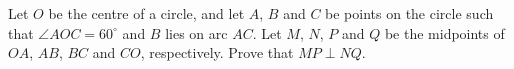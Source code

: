 Let $O$ be the centre of a circle, and let $A$, $B$ and $C$ be points on the circle such that $\angle AOC=60^\circ$ and $B$ lies on arc $AC$. Let $M$, $N$, $P$ and $Q$ be the midpoints of $OA$, $AB$, $BC$ and $CO$, respectively. Prove that $MP\perp NQ$.
